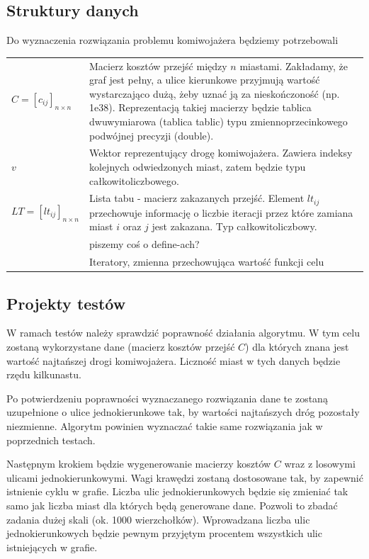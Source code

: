\documentclass[11pt,a4paper,twoside]{article}
\begin{document}
\subsection{Struktury danych}
Do wyznaczenia rozwiązania problemu komiwojażera będziemy potrzebowali
\bgroup
\def\arraystretch{1.5}
\begin{tabularx}{\textwidth}{l|X}
$C = [c_{ij}]_{n\times n}$ & Macierz kosztów przejść między $n$ miastami. Zakładamy, że graf jest pełny, a ulice kierunkowe przyjmują wartość wystarczająco dużą, żeby uznać ją za nieskończoność (np. 1e38). Reprezentacją takiej macierzy będzie tablica dwuwymiarowa (tablica tablic) typu zmiennoprzecinkowego podwójnej precyzji (double).\\
$v$ & Wektor reprezentujący drogę komiwojażera. Zawiera indeksy kolejnych odwiedzonych miast, zatem będzie typu całkowitoliczbowego. \\
$LT = [lt_{ij}]_{n\times n}$ & Lista tabu - macierz zakazanych przejść. Element $lt_{ij}$ przechowuje informację o liczbie iteracji przez które zamiana miast $i$ oraz $j$ jest zakazana. Typ całkowitoliczbowy.\\
 & piszemy coś o define-ach?\\
 & Iteratory, zmienna przechowująca wartość funkcji celu\\
\end{tabularx}
\egroup
\subsection{Projekty testów}
W ramach testów należy sprawdzić poprawność działania algorytmu. W tym celu zostaną wykorzystane dane (macierz kosztów przejść $C$) dla których znana jest wartość najtańszej drogi komiwojażera. Liczność miast w tych danych będzie rzędu kilkunastu.

Po potwierdzeniu poprawności wyznaczanego rozwiązania dane te zostaną uzupełnione o ulice jednokierunkowe tak, by wartości najtańszych dróg pozostały niezmienne. Algorytm powinien wyznaczać takie same rozwiązania jak w poprzednich testach.

Następnym krokiem będzie wygenerowanie macierzy kosztów $C$ wraz z losowymi ulicami jednokierunkowymi. Wagi krawędzi zostaną dostosowane tak, by zapewnić istnienie cyklu w grafie. Liczba ulic jednokierunkowych będzie się zmieniać tak samo jak liczba miast dla których będą generowane dane. Pozwoli to zbadać zadania dużej skali (ok. 1000 wierzchołków). Wprowadzana liczba ulic jednokierunkowych będzie pewnym przyjętym procentem wszystkich ulic istniejących w grafie.
\end{document}

